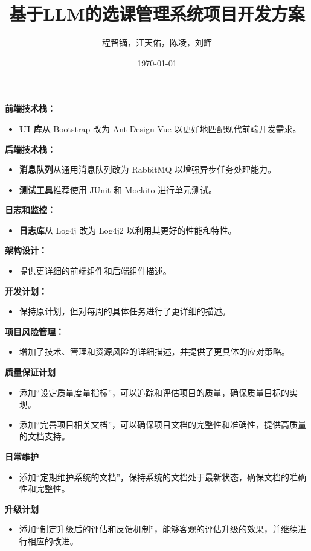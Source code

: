 \documentclass{article}
\title{基于LLM的选课管理系统项目开发方案}
\author{程智镝，汪天佑，陈凌，刘辉}
\date{\today}
\begin{document}
\maketitle

\textbf{前端技术栈：}
\begin{itemize}
    \item \textbf{UI 库}从 Bootstrap 改为 Ant Design Vue 以更好地匹配现代前端开发需求。
\end{itemize}

\textbf{后端技术栈：}
\begin{itemize}
    \item \textbf{消息队列}从通用消息队列改为 RabbitMQ 以增强异步任务处理能力。
    \item \textbf{测试工具}推荐使用 JUnit 和 Mockito 进行单元测试。
\end{itemize}

\textbf{日志和监控：}
\begin{itemize}
    \item \textbf{日志库}从 Log4j 改为 Log4j2 以利用其更好的性能和特性。
\end{itemize}

\textbf{架构设计：}
\begin{itemize}
    \item 提供更详细的前端组件和后端组件描述。
\end{itemize}

\textbf{开发计划：}
\begin{itemize}
    \item 保持原计划，但对每周的具体任务进行了更详细的描述。
\end{itemize}

\textbf{项目风险管理：}
\begin{itemize}
    \item 增加了技术、管理和资源风险的详细描述，并提供了更具体的应对策略。
\end{itemize}

\textbf{质量保证计划}
\begin{itemize}
	\item 添加“设定质量度量指标”，可以追踪和评估项目的质量，确保质量目标的实现。
	\item 添加“完善项目相关文档”，可以确保项目文档的完整性和准确性，提供高质量的文档支持。
\end{itemize}

\textbf{日常维护}
\begin{itemize}
	\item 添加“定期维护系统的文档”，保持系统的文档处于最新状态，确保文档的准确性和完整性。
\end{itemize}

\textbf{升级计划}
\begin{itemize}
	\item 添加“制定升级后的评估和反馈机制”，能够客观的评估升级的效果，并继续进行相应的改进。
\end{itemize}
\end{document}
